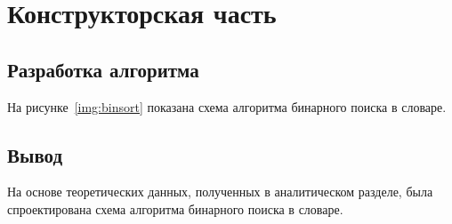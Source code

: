 \chapter{Конструкторская часть}

\section*{Разработка алгоритма}

На рисунке~\ref{img:binsort} показана схема алгоритма бинарного поиска в словаре.

\section*{Вывод}

На основе теоретических данных, полученных в аналитическом разделе, была спроектирована схема алгоритма бинарного поиска в словаре.